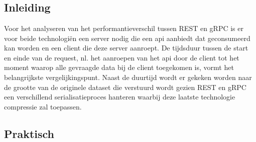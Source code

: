 
\chapter{}%
\label{ch:methodologie}


\section{Inleiding}

Voor het analyseren van het performantieverschil tussen REST en gRPC is er voor beide technologiën een server nodig die een api aanbiedt dat geconsumeerd kan worden en
een client die deze server aanroept.
De tijdsduur tussen de start en einde van de request, nl. het aanroepen van het api door de client
tot het moment waarop alle gevraagde data bij de client toegekomen is, vormt het belangrijkste vergelijkingspunt.
Naast de duurtijd wordt er gekeken worden naar de grootte van de originele dataset die verstuurd wordt gezien REST en gRPC
een verschillend serialisatieproces hanteren waarbij deze laatste technologie compressie zal toepassen.

\section{Praktisch}

